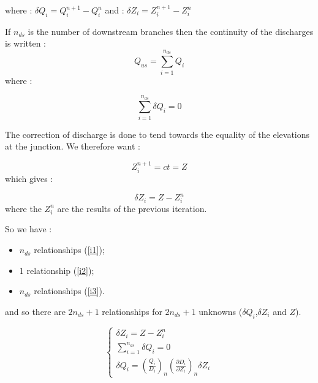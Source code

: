 where : $\delta Q_i = Q_{i}^{n+1} - Q_{i}^{n}$
\hspace{1cm} and : $\delta Z_i = Z_{i}^{n+1} - Z_{i}^{n}$

\vspace{0.5cm}

If $n_{ds}$ is the number of downstream branches then the continuity of the discharges is written  :
\begin{equation}
  Q_{us} = \sum_{i=1}^{n_{ds}} Q_i
\end{equation}
where :

\begin{equation}
 \label{i2}
 \sum_{i=1}^{n_{ds}} \delta Q_i = 0
\end{equation}


\vspace{0.5cm}

The correction of discharge is done to tend towards the equality of the elevations at the junction. We therefore want :

\begin{equation}
 Z_{i}^{n+1} = ct = Z
\end{equation}
which gives :

\begin{equation}
 \label{i3}
  \delta Z_i = Z - Z_{i}^n
\end{equation}
where the $Z_{i}^n$ are the results of the previous iteration.

\vspace{0.5cm}

So we have :
\begin{itemize}
 \item $n_{ds}$ relationships (\ref{i1});
 \item 1 relationship (\ref{i2});
 \item $n_{ds}$ relationships (\ref{i3}).
\end{itemize}
and so there are $2n_{ds}+1$ relationships for $2n_{ds}+1$ unknowns ($\delta Q_i$,$\delta Z_i$ and $Z$).

\begin{equation}
 \left \lbrace
  \begin{array}{l}
    \delta Z_i = Z - Z_{i}^n \\
    \sum_{i=1}^{n_{ds}} \delta Q_i = 0 \\
    \delta Q_i = \left ( \frac{Q_i}{D_i} \right )_n \left ( \frac{\partial D_i}{\partial Z_i} \right )_n \delta Z_i
  \end{array}
 \right.
\end{equation}

